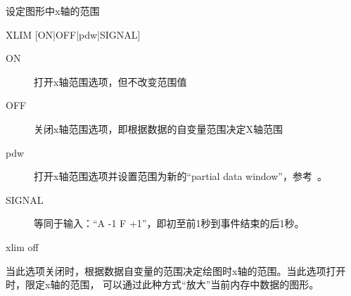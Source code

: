 \label{cmd:xlim}

设定图形中x轴的范围

\begin{SACSTX}
XLIM [ON|OFF|pdw|SIGNAL]
\end{SACSTX}

\begin{description}
\item [ON] 打开x轴范围选项，但不改变范围值
\item [OFF] 关闭x轴范围选项，即根据数据的自变量范围决定X轴范围
\item [pdw] 打开x轴范围选项并设置范围为新的``partial data window''，参考~。
\item [SIGNAL] 等同于输入：``A -1 F +1''，即初至前1秒到事件结束的后1秒。
\end{description}

\begin{SACDFT}
xlim off
\end{SACDFT}

当此选项关闭时，根据数据自变量的范围决定绘图时x轴的范围。当此选项打开时，限定x轴的范围，
可以通过此种方式``放大''当前内存中数据的图形。

